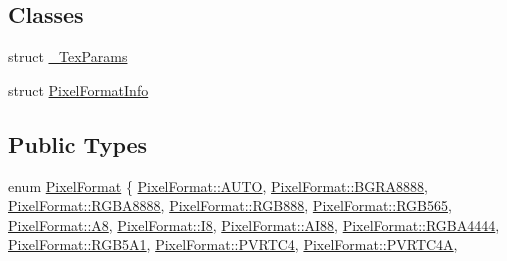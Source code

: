 \subsection*{Classes}
\begin{DoxyCompactItemize}
\item 
struct \hyperlink{structTexture2D_1_1__TexParams}{\+\_\+\+Tex\+Params}
\item 
struct \hyperlink{structTexture2D_1_1PixelFormatInfo}{Pixel\+Format\+Info}
\end{DoxyCompactItemize}
\subsection*{Public Types}
\begin{DoxyCompactItemize}
\item 
enum \hyperlink{classTexture2D_a45d9d8bb5a0669def36bbdfbfb91d220}{Pixel\+Format} \{ \newline
\hyperlink{classTexture2D_a45d9d8bb5a0669def36bbdfbfb91d220ae1f2d5134ed2543d38a0de9751cf75d9}{Pixel\+Format\+::\+A\+U\+TO}, 
\hyperlink{classTexture2D_a45d9d8bb5a0669def36bbdfbfb91d220a0ec600bfbcf9efd33a5d337700f19896}{Pixel\+Format\+::\+B\+G\+R\+A8888}, 
\hyperlink{classTexture2D_a45d9d8bb5a0669def36bbdfbfb91d220a165f06116e7b8d9b2481dfc805db4619}{Pixel\+Format\+::\+R\+G\+B\+A8888}, 
\hyperlink{classTexture2D_a45d9d8bb5a0669def36bbdfbfb91d220a30ff380a3be74628024063a99fba10f0}{Pixel\+Format\+::\+R\+G\+B888}, 
\newline
\hyperlink{classTexture2D_a45d9d8bb5a0669def36bbdfbfb91d220a3b73e4d15701467ed72f157ffaff680a}{Pixel\+Format\+::\+R\+G\+B565}, 
\hyperlink{classTexture2D_a45d9d8bb5a0669def36bbdfbfb91d220afd301d675be7b677ba979a430a80c010}{Pixel\+Format\+::\+A8}, 
\hyperlink{classTexture2D_a45d9d8bb5a0669def36bbdfbfb91d220a5aef4e3ea379fa0eb2bf42d979443902}{Pixel\+Format\+::\+I8}, 
\hyperlink{classTexture2D_a45d9d8bb5a0669def36bbdfbfb91d220a718542a7d1bf328b4f9507f27da43494}{Pixel\+Format\+::\+A\+I88}, 
\newline
\hyperlink{classTexture2D_a45d9d8bb5a0669def36bbdfbfb91d220a3660a3d64821411531dc60f54cee4f52}{Pixel\+Format\+::\+R\+G\+B\+A4444}, 
\hyperlink{classTexture2D_a45d9d8bb5a0669def36bbdfbfb91d220a145a041c8e2080c43fa129fb5b17d8be}{Pixel\+Format\+::\+R\+G\+B5\+A1}, 
\hyperlink{classTexture2D_a45d9d8bb5a0669def36bbdfbfb91d220a759978c6ff5b5e0ce1720f8dd863e3bf}{Pixel\+Format\+::\+P\+V\+R\+T\+C4}, 
\hyperlink{classTexture2D_a45d9d8bb5a0669def36bbdfbfb91d220ae4f65a663abc68a4fd703b0b69588319}{Pixel\+Format\+::\+P\+V\+R\+T\+C4A}, 

\end{DoxyCompactItemize}
